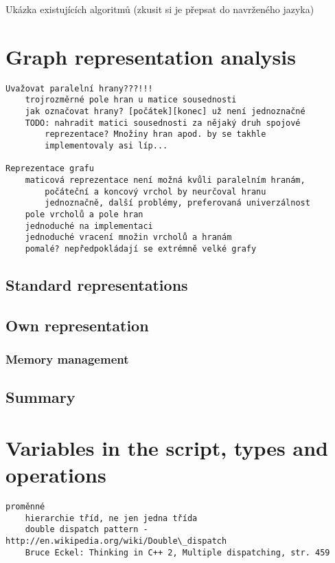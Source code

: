 \documentclass[11pt,twoside,a4paper]{book}
\begin{document}
Ukázka existujících algoritmů (zkusit si je přepsat do navrženého jazyka)

\section{Graph representation analysis}

\begin{verbatim}
Uvažovat paralelní hrany???!!!
	trojrozměrné pole hran u matice sousednosti
	jak označovat hrany? [počátek][konec] už není jednoznačné
	TODO: nahradit matici sousednosti za nějaký druh spojové
		reprezentace? Množiny hran apod. by se takhle
		implementovaly asi líp...

Reprezentace grafu
	maticová reprezentace není možná kvůli paralelním hranám,
		počáteční a koncový vrchol by neurčoval hranu
		jednoznačně, další problémy, preferovaná univerzálnost
	pole vrcholů a pole hran
	jednoduché na implementaci
	jednoduché vracení množin vrcholů a hranám
	pomalé? nepředpokládají se extrémně velké grafy
\end{verbatim}


\subsection{Standard representations}

\subsection{Own representation}

\subsubsection{Memory management}

\subsection{Summary}


\section{Variables in the script, types and operations}

\begin{verbatim}
proměnné
	hierarchie tříd, ne jen jedna třída
	double dispatch pattern - http://en.wikipedia.org/wiki/Double\_dispatch
	Bruce Eckel: Thinking in C++ 2, Multiple dispatching, str. 459
\end{verbatim}
\end{document}
